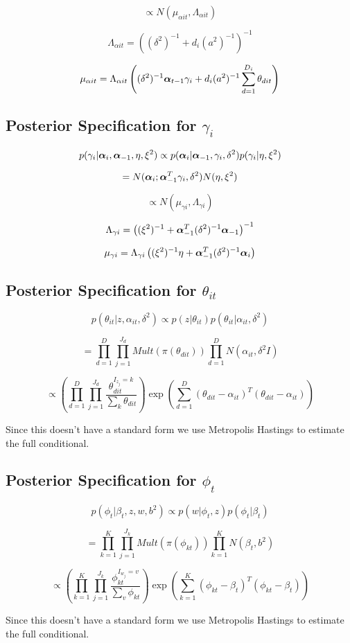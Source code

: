 \documentclass[a4paper]{article}
\begin{document}
\[\propto N(\mu_{\alpha i t}, \Lambda_{\alpha i t})\]

\[\Lambda_{\alpha i t} = ((\delta^2)^{-1} + d_i (a^2)^{-1})^{-1}\]

\[\mu_{\alpha i t} = \Lambda_{\alpha i t} \left((\delta^2)^{-1}\text{\boldmath$\alpha$}_{t-1} \gamma_i + d_i (a^2)^{-1} \sum_{d=1}^{D_i} \theta_{dit}\right) \]

\subsection{Posterior Specification for $\gamma_i$}

\[p(\gamma_i | \text{\boldmath$\alpha$}_{i}, \text{\boldmath$\alpha$}_{-1}, \eta, \xi^2) \propto p(\text{\boldmath$\alpha$}_i | \text{\boldmath$\alpha$}_{-1}, \gamma_i, \delta^2) p(\gamma_i | \eta, \xi^2)\]

\[= N(\text{\boldmath$\alpha$}_{i};\text{\boldmath$\alpha$}_{-1}^T \gamma_i, \delta^2)N(\eta, \xi^2)\]

\[\propto N(\mu_{\gamma i}, \Lambda_{\gamma i})\]

\[\Lambda_{\gamma i} = \left((\xi^2)^{-1} + \text{\boldmath$\alpha$}_{-1}^T(\delta^2)^{-1}\text{\boldmath$\alpha$}_{-1}\right)^{-1}\]

\[\mu_{\gamma i} = \Lambda_{\gamma i} \left((\xi^2)^{-1} \eta + \text{\boldmath$\alpha$}_{-1}^T(\delta^2)^{-1}\text{\boldmath$\alpha$}_{i}\right)\]

\subsection{Posterior Specification for $\theta_{it}$}

\[p(\theta_{it} | z, \alpha_{it}, \delta^2) \propto p(z | \theta_{it}) p(\theta_{it} | \alpha_{it}, \delta^2)\]

\[= \prod_{d=1}^D \prod_{j=1}^{J_d} Mult(\pi(\theta_{dit}))\prod_{d=1}^D N(\alpha_{it}, \delta^2I)\]

\[\propto \left(\prod_{d=1}^D \prod_{j=1}^{J_d} \frac{\theta_{dit}^{I_{z_j}=k}}{\sum_k \theta_{dit}}\right) \exp{\left(\sum_{d=1}^D(\theta_{dit} - \alpha_{it})^T(\theta_{dit} - \alpha_{it})\right)} \]

Since this doesn't have a standard form we use Metropolis Hastings to estimate the full conditional.

\subsection{Posterior Specification for $\phi_t$}

\[p(\phi_t | \beta_t, z, w, b^2) \propto p(w | \phi_t, z) p(\phi_t | \beta_t)\]

\[= \prod_{k=1}^K \prod_{j=1}^{J_k} Mult(\pi(\phi_{kt}))\prod_{k=1}^K N(\beta_t, b^2)\]

\[\propto \left(\prod_{k=1}^K \prod_{j=1}^{J_k} \frac{\phi_{kt}^{I_{w_j}=v}}{\sum_v \phi_{kt}}\right) \exp{\left(\sum_{k=1}^K(\phi_{kt} - \beta_t)^T(\phi_{kt} - \beta_t)\right)}\]

Since this doesn't have a standard form we use Metropolis Hastings to estimate the full conditional.
\end{document}
